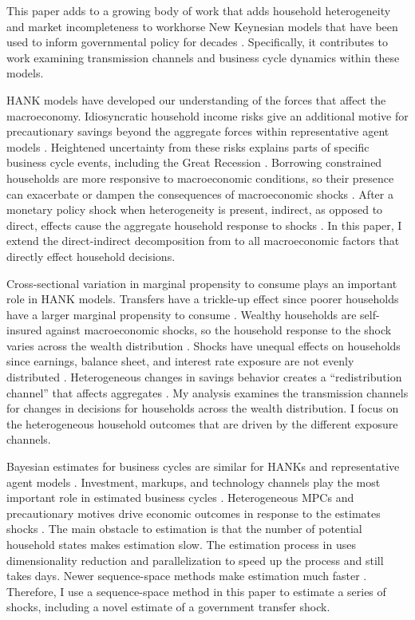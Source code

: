 This paper adds to a growing body of work that adds household heterogeneity and market incompleteness to workhorse New Keynesian models that have been used to inform governmental policy for decades \autocites{woodford2005interest}{smets2007shocks}. Specifically, it contributes to work examining transmission channels and business cycle dynamics within these models. 

HANK models have developed our understanding of the forces that affect the macroeconomy. Idiosyncratic household income risks give an additional motive for precautionary savings beyond the aggregate forces within representative agent models \autocites{mckay2016power}{auclert2020micro}{acharya2023optimal}. Heightened uncertainty from these risks explains parts of specific business cycle events, including the Great Recession \autocites{bayer2019precautionary}. Borrowing constrained households are more responsive to macroeconomic conditions, so their presence can exacerbate or dampen the consequences of macroeconomic shocks \autocites{bilbiie2020new}. After a monetary policy shock when heterogeneity is present, indirect, as opposed to direct, effects cause the aggregate household response to shocks \autocites{kaplan2018monetary}. In this paper, I extend the direct-indirect decomposition from \textcite{kaplan2018monetary} to all macroeconomic factors that directly effect household decisions. 

Cross-sectional variation in marginal propensity to consume plays an important role in HANK models. Transfers have a trickle-up effect since poorer households have a larger marginal propensity to consume \autocite{auclert2023trickling}. Wealthy households are self-insured against macroeconomic shocks, so the household response to the shock varies across the wealth distribution \autocite{gornemann2016doves}. Shocks have unequal effects on households since earnings, balance sheet, and interest rate exposure are not evenly distributed \autocite{auclert2019monetary}. Heterogeneous changes in savings behavior creates a ``redistribution channel'' that affects aggregates \autocite{auclert2019monetary}. My analysis examines the transmission channels for changes in decisions for households across the wealth distribution. I focus on the heterogeneous household outcomes that are driven by the different exposure channels.

Bayesian estimates for business cycles are similar for HANKs and representative agent models \autocites{smets2007shocks}{bayer2024shocks}. Investment, markups, and technology channels play the most important role in estimated business cycles \autocites{auclert2020micro}{bayer2024shocks}. Heterogeneous MPCs and precautionary motives drive economic outcomes in response to the estimates shocks \autocite{auclert2020micro}. The main obstacle to estimation is that the number of potential household states makes estimation slow. The estimation process in \textcite{bayer2024shocks} uses dimensionality reduction and parallelization to speed up the process and still takes days. Newer sequence-space methods make estimation much faster \autocite{auclert2021using}. Therefore, I use a sequence-space method in this paper to estimate a series of shocks, including a novel estimate of a government transfer shock.
